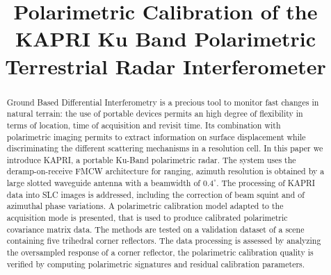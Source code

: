 \documentclass[12pt]{IEEEtran}
\title{Polarimetric Calibration of the KAPRI Ku Band Polarimetric Terrestrial Radar Interferometer}
\author{\IEEEauthorblockN{
	Simone Baffelli\IEEEauthorrefmark{1},
	Othmar Frey\IEEEauthorrefmark{2},
	Charles Werner\IEEEauthorrefmark{3}
	Irena Hajnsek\IEEEauthorrefmark{4}
}}
\begin{document}
\maketitle
\begin{abstract}
Ground Based Differential Interferometry is a precious tool to monitor fast changes in natural terrain: the use of portable devices permits an high degree of flexibility in terms of location, time of acquisition and revisit time. Its combination with polarimetric imaging permits to extract information on surface displacement while discriminating the different scattering mechanisms in a resolution cell.
In this paper we introduce KAPRI, a portable Ku-Band polarimetric radar. The system uses the deramp-on-receive FMCW architecture for ranging, azimuth resolution is obtained by a large slotted waveguide antenna with a beamwidth of $0.4^\circ$. The processing of KAPRI data into SLC images is addressed, including the correction of beam squint and of azimuthal phase variations. A polarimetric calibration model adapted to the acquisition mode is presented, that is used to produce calibrated polarimetric covariance matrix data. The methods are tested on a validation dataset of a scene containing five trihedral corner reflectors. The data processing is assessed by analyzing the oversampled response of a corner reflector, the polarimetric calibration quality is verified by computing polarimetric signatures and residual calibration parameters.
\end{abstract}






\end{document}
